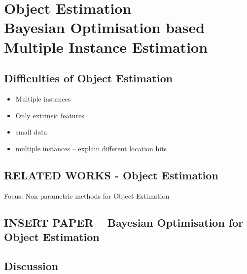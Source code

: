 \chapter{Object Estimation \\ {\Large Bayesian Optimisation based Multiple Instance Estimation}}
\label{chap:QSRs}

\section{Difficulties of Object Estimation}
\begin{itemize}
\item Multiple instances
\item Only extrinsic features
\item small data
\item multiple instances -- explain different location hits
\end{itemize}
\section{RELATED WORKS - Object Estimation}
Focus: Non parametric methods for Object Estimation
\section{INSERT PAPER -- Bayesian Optimisation for Object Estimation}
\section{Discussion}

